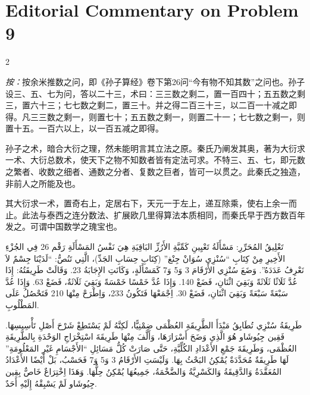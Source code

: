 \documentclass[11pt,a4paper]{article}
\newcommand{\ar}[1]{\arabicfont\beginR #1\endR}
\providecommand{\enquote}[1]{``#1''}
\newenvironment{bilingual}{%
  \begin{paracol}{2}
}{%
  \end{paracol}
}
\begin{document}
\newpage

\section*{Editorial Commentary on Problem 9}

\begin{bilingual}

\begin{leftcolumn*}
\textit{按：}按余米推数之问，即《孙子算经》卷下第26问``今有物不知其数''之问也。孙子设三、五、七为问，答以二十三，术曰：三三数之剩二，置一百四十；五五数之剩三，置六十三；七七数之剩二，置三十。并之得二百三十三，以二百一十减之即得。凡三三数之剩一，则置七十；五五数之剩一，则置二十一；七七数之剩一，则置十五。一百六以上，以一百五减之即得。

孙子之术，暗合大衍之理，然未能明言其立法之原。秦氏乃阐发其奥，著为大衍求一术、大衍总数术，使天下之物不知数者皆有定法可求。不特三、五、七，即元数之繁者、收数之细者、通数之分者、复数之巨者，皆可一以贯之。此秦氏之独造，非前人之所能及也。

其大衍求一术，置奇右上，定居右下，天元一于左上，递互除乘，使右上余一而止。此法与泰西之连分数法、扩展欧几里得算法本质相同，而秦氏早于西方数百年发之。可谓中国数学之瑰宝也。
\end{leftcolumn*}

\begin{rightcolumn*}
\ar{تَعْلِيقُ المُحَرِّرِ: مَسْأَلَةُ تَعْيِينِ كَمِّيَّةِ الأَرُزِّ البَاقِيَةِ هِيَ نَفْسُ المَسْأَلَةِ رَقْم 26 فِي الجُزْءِ الأَخِيرِ مِنْ كِتَابِ \enquote{سُنْزِي سُوَانْ جِنْغ} (كِتَابِ حِسَابِ الجَدِّ)، الَّتِي تَنُصُّ: \enquote{لَدَيْنَا جِسْمٌ لاَ نَعْرِفُ عَدَدَهُ}. وَضَعَ سُنْزِي الأَرْقَامَ 3 وَ5 وَ7 كَمَسْأَلَةٍ، وَكَانَتِ الإِجَابَةُ 23. وَقَالَتْ طَرِيقَتُهُ: إِذَا عُدَّ ثَلَاثًا ثَلَاثَةً وَبَقِيَ اثْنَانِ، فَضَعْ 140. وَإِذَا عُدَّ خَمْسًا خَمْسَةً وَبَقِيَ ثَلَاثَةٌ، فَضَعْ 63. وَإِذَا عُدَّ سَبْعَةً سَبْعَةً وَبَقِيَ اثْنَانِ، فَضَعْ 30. اِجْمَعْهَا فَتَكُونُ 233، وَاِطْرَحْ مِنْهَا 210 فَتَحْصُلُ عَلَى المَطْلُوبِ.}

\ar{طَرِيقَةُ سُنْزِي تُطَابِقُ مَبْدَأَ الطَّرِيقَةِ العُظْمَى ضِمْنِيًّا، لَكِنَّهُ لَمْ يَسْتَطِعْ شَرْحَ أَصْلِ تَأْسِيسِهَا. فَقِين جِيُوشَاو هُوَ الَّذِي وَضَحَ أَسْرَارَهَا، وَأَلَّفَ مِنْهَا طَرِيقَةَ اسْتِخْرَاجِ الوَحْدَةِ بِالطَّرِيقَةِ العُظْمَى، وَطَرِيقَةَ جَمْعِ الأَعْدَادِ الكُلِّيَّةِ، حَتَّى صَارَتْ كُلُّ مَسَائِلِ \enquote{الأَجْسَامِ غَيْرِ المَعْلُومَةِ} لَهَا طَرِيقَةٌ مُحَدَّدَةٌ يُمْكِنُ البَحْثُ بِهَا. وَلَيْسَتِ الأَرْقَامُ 3 وَ5 وَ7 فَحَسْبُ، بَلْ أَيْضًا الأَعْدَادُ المُعَقَّدَةُ وَالدَّقِيقَةُ وَالكَسْرِيَّةُ وَالضَّخْمَةُ، جَمِيعُهَا يُمْكِنُ حِلُّهَا. وَهَذَا اِخْتِرَاعٌ خَاصٌّ بِقِين جِيُوشَاو لَمْ يَسْبِقْهُ إِلَيْهِ أَحَدٌ.}


\end{rightcolumn*}
\end{bilingual}
\end{document}
